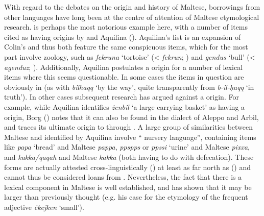 \documentclass[output=paper]{langsci/langscibook}
\begin{document}

With regard to the debates on the origin and history of Maltese, borrowings from other  languages have long been at the centre of attention of Maltese etymological research.  is perhaps the most notorious example here, with a number of items cited as having  origins by \cite{colin1957} and Aquilina (\citeyear[25--39]{aquilina1976}). Aquilina's list is an expansion of Colin's and thus both feature the same conspicuous items, which for the most part involve zoology, such as \textit{fekruna} `tortoise' (< \textit{fekrun}; \citealt[553]{naitzerrad2002}) and \textit{gendus} `bull' (< \textit{agenduz}; \citealt[827]{naitzerrad2002}).
Additionally, Aquilina postulates a  origin for a number of lexical items where this seems questionable. In some cases the items in question are obviously   in  (as with \textit{bilħaqq} `by the way', quite transparently from  \textit{b-il-\d{h}aqq} `in truth'). In other cases subsequent research has argued against a  origin. For example, while Aquilina identifies \textit{żenbil} `a large carrying basket' as having a  origin, Borg (\citeyear[261]{Borg2004}) notes that it can also be found in the  dialect of Aleppo and Arbil, and traces its ultimate origin to  through . A large group of similarities between Maltese and  identified by Aquilina involve `` nursery language'', containing items like  \textit{papa} `bread' and Maltese \textit{pappa},  \textit{ppspps} or \textit{ppssi} `urine' and Maltese \textit{pixxa}, and  \textit{kakka/qaqah} and Maltese \textit{kakka} (both having to do with defecation). These forms are actually attested cross-linguistically (\citealt{ferguson1964}) at least as far north as  (\citealt{ondrackova2010}) and cannot thus be considered loans from . Nevertheless, the fact that there is a  lexical component in Maltese is well established, and \cite{Souag2018berber} has shown that it may be larger than previously thought (e.g. his case for the  etymology of the frequent adjective \textit{ċkejken} `small').
\end{document}
